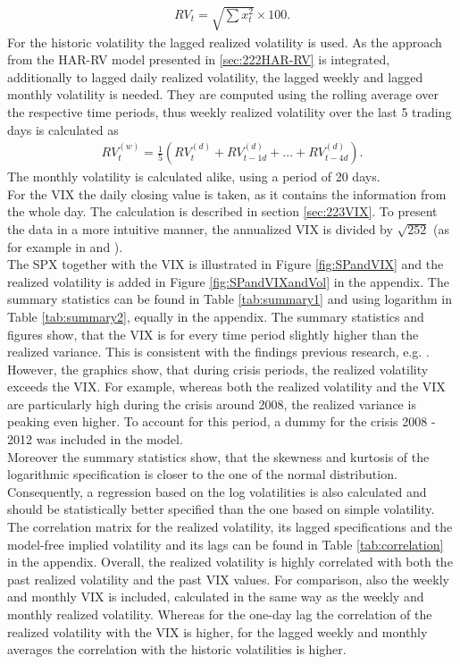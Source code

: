 \begin{align}
RV_{t} = \sqrt{\sum x_{t}^{2}} \times 100.
\end{align}
For the historic volatility the lagged realized volatility is used. As the approach from the HAR-RV model presented in \ref{sec:222HAR-RV} is integrated, additionally to lagged daily realized volatility, the lagged weekly and lagged monthly volatility is needed. They are computed using the rolling average over the respective time periods, thus weekly realized volatility over the last 5 trading days is calculated as
\begin{align}
RV_{t}^{(w)} = \frac{1}{5} (RV_{t}^{(d)} + RV_{t-1d}^{(d)} + ... + RV_{t-4d}^{(d)}).
\end{align}
The monthly volatility is calculated alike, using a period of 20 days.\\
For the \ac{VIX} the daily closing value is taken, as it contains the information from the whole day. The calculation is described in section \ref{sec:223VIX}. To present the data in a more intuitive manner, the annualized \ac{VIX} is divided by $\sqrt{252}$ (as for example in \textcite{blair2001} and \textcite{whaley2008}).\\
The \ac{SPX} together with the \ac{VIX} is illustrated in Figure \ref{fig:SPandVIX} and the realized volatility is added in Figure \ref{fig:SPandVIXandVol} in the appendix. The summary statistics can be found in Table \ref{tab:summary1} and using logarithm in Table \ref{tab:summary2}, equally in the appendix. The summary statistics and figures show, that the \ac{VIX} is for every time period slightly higher than the realized variance. This is consistent with the findings previous research, e.g. \textcite{jiang2003}. However, the graphics show, that during crisis periods, the realized volatility exceeds the \ac{VIX}. For example, whereas both the realized volatility and the \ac{VIX} are particularly high during the crisis around 2008, the realized variance is peaking even higher. To account for this period, a dummy for the crisis 2008 - 2012 was included in the model.\\
Moreover the summary statistics show, that the skewness and kurtosis of the logarithmic specification is closer to the one of the normal distribution. Consequently, a regression based on the log volatilities is also calculated and should be statistically better specified than the one based on simple volatility.\\
The correlation matrix for the realized volatility, its lagged specifications and the model-free implied volatility and its lags can be found in Table \ref{tab:correlation} in the appendix. Overall, the realized volatility is highly correlated with both the past realized volatility and the past \ac{VIX} values. For comparison, also the weekly and monthly \ac{VIX} is included, calculated in the same way as the weekly and monthly realized volatility. Whereas for the one-day lag the correlation of the realized volatility with the \ac{VIX} is higher, for the lagged weekly and monthly averages the correlation with the historic volatilities is higher. 

